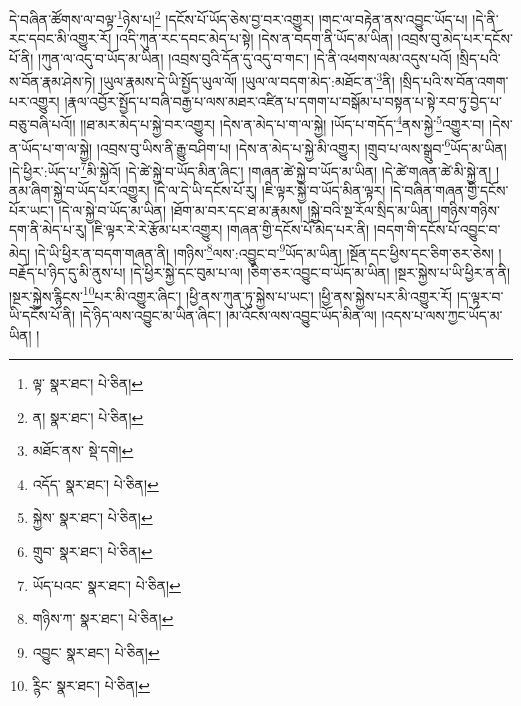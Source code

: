 དེ་བཞིན་ཚོགས་ལ་བལྟ་\footnote{ལྟ་  སྣར་ཐང་།  པེ་ཅིན། }ཉེས་པ།\footnote{ན།  སྣར་ཐང་།  པེ་ཅིན། } །དངོས་པོ་ཡོད་ཅེས་བྱ་བར་འགྱུར། །གང་ལ་བརྟེན་ནས་འབྱུང་ཡོད་པ། །དེ་ནི་རང་དབང་མི་འགྱུར་རོ། །འདི་ཀུན་རང་དབང་མེད་པ་སྟེ། །དེས་ན་བདག་ནི་ཡོད་མ་ཡིན། །འབྲས་བུ་མེད་པར་དངོས་པོ་ནི། །ཀུན་ལ་འདུ་བ་ཡོད་མ་ཡིན། །འབྲས་བུའི་དོན་དུ་འདུ་བ་གང་། །དེ་ནི་འཕགས་ལམ་འདུས་པའོ། །སྲིད་པའི་ས་བོན་རྣམ་ཤེས་ཏེ། །ཡུལ་རྣམས་དེ་ཡི་སྤྱོད་ཡུལ་ལོ། །ཡུལ་ལ་བདག་མེད་:མཐོང་ན་\footnote{མཐོང་ནས་  སྡེ་དགེ། }ནི། །སྲིད་པའི་ས་བོན་འགག་པར་འགྱུར། །རྣལ་འབྱོར་སྤྱོད་པ་བཞི་བརྒྱ་པ་ལས་མཐར་འཛིན་པ་དགག་པ་བསྒོམ་པ་བསྟན་པ་སྟེ་རབ་ཏུ་བྱེད་པ་བཅུ་བཞི་པའོ།། །།ཐ་མར་མེད་པ་སྐྱེ་བར་འགྱུར། །དེས་ན་མེད་པ་ག་ལ་སྐྱེ། །ཡོད་པ་གདོད་\footnote{འདོད་  སྣར་ཐང་།  པེ་ཅིན། }ནས་སྐྱེ་\footnote{སྐྱེས་  སྣར་ཐང་།  པེ་ཅིན། }འགྱུར་བ། །དེས་ན་ཡོད་པ་ག་ལ་སྐྱེ། །འབྲས་བུ་ཡིས་ནི་རྒྱུ་བཤིག་པ། །དེས་ན་མེད་པ་སྐྱེ་མི་འགྱུར། །གྲུབ་པ་ལས་སྒྲུབ་\footnote{གྲུབ་  སྣར་ཐང་།  པེ་ཅིན། }ཡོད་མ་ཡིན། །དེ་ཕྱིར་:ཡོད་པ་\footnote{ཡོད་པའང་  སྣར་ཐང་།  པེ་ཅིན། }མི་སྐྱེའོ། །དེ་ཚེ་སྐྱེ་བ་ཡོད་མིན་ཞིང་། །གཞན་ཚེ་སྐྱེ་བ་ཡོད་མ་ཡིན། །དེ་ཚེ་གཞན་ཚེ་མི་སྐྱེ་ན། །ནམ་ཞིག་སྐྱེ་བ་ཡོད་པར་འགྱུར། །དེ་ལ་དེ་ཡི་དངོས་པོ་རུ། །ཇི་ལྟར་སྐྱེ་བ་ཡོད་མིན་ལྟར། །དེ་བཞིན་གཞན་གྱི་དངོས་པོར་ཡང་། །དེ་ལ་སྐྱེ་བ་ཡོད་མ་ཡིན། །ཐོག་མ་བར་དང་ཐ་མ་རྣམས། །སྐྱེ་བའི་སྔ་རོལ་སྲིད་མ་ཡིན། །གཉིས་གཉིས་དག་ནི་མེད་པ་རུ། །ཇི་ལྟར་རེ་རེ་རྩོམ་པར་འགྱུར། །གཞན་གྱི་དངོས་པོ་མེད་པར་ནི། །བདག་གི་དངོས་པོ་འབྱུང་བ་མེད། །དེ་ཡི་ཕྱིར་ན་བདག་གཞན་ནི། །གཉིས་\footnote{གཉིས་ཀ་  སྣར་ཐང་།  པེ་ཅིན། }ལས་:འབྱུང་བ་\footnote{འབྱུང་  སྣར་ཐང་།  པེ་ཅིན། }ཡོད་མ་ཡིན། །སྔོན་དང་ཕྱིས་དང་ཅིག་ཅར་ཅེས། །བརྗོད་པ་ཉིད་དུ་མི་ནུས་པ། །དེ་ཕྱིར་སྐྱེ་དང་བུམ་པ་ལ། །ཅིག་ཅར་འབྱུང་བ་ཡོད་མ་ཡིན། །སྔར་སྐྱེས་པ་ཡི་ཕྱིར་ན་ནི། །སྔར་སྐྱེས་རྙིངས་\footnote{ཪྙིང་  སྣར་ཐང་།  པེ་ཅིན། }པར་མི་འགྱུར་ཞིང་། །ཕྱི་ནས་ཀུན་ཏུ་སྐྱེས་པ་ཡང་། །ཕྱི་ནས་སྐྱེས་པར་མི་འགྱུར་རོ། །ད་ལྟར་བ་ཡི་དངོས་པོ་ནི། །དེ་ཉིད་ལས་འབྱུང་མ་ཡིན་ཞིང་། །མ་འོངས་ལས་འབྱུང་ཡོད་མིན་ལ། །འདས་པ་ལས་ཀྱང་ཡོད་མ་ཡིན། །
